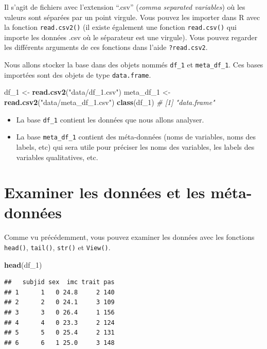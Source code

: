 \documentclass[
]{book}
\newenvironment{Shaded}{\begin{snugshade}}{\end{snugshade}}
\newcommand{\CommentTok}[1]{\textcolor[rgb]{0.56,0.35,0.01}{\textit{#1}}}
\newcommand{\FunctionTok}[1]{\textcolor[rgb]{0.13,0.29,0.53}{\textbf{#1}}}
\newcommand{\NormalTok}[1]{#1}
\newcommand{\OtherTok}[1]{\textcolor[rgb]{0.56,0.35,0.01}{#1}}
\newcommand{\StringTok}[1]{\textcolor[rgb]{0.31,0.60,0.02}{#1}}
\providecommand{\tightlist}{%
  \setlength{\itemsep}{0pt}\setlength{\parskip}{0pt}}
\begin{document}
Il s'agit de fichiers avec l'extension ``.csv'' (\emph{comma separated variables}) où les valeurs sont séparées par un point virgule. Vous pouvez les importer dans R avec la fonction \texttt{read.csv2()} (il existe également une fonction \texttt{read.csv()} qui importe les données .csv où le séparateur est une virgule). Vous pouvez regarder les différents arguments de ces fonctions dans l'aide \texttt{?read.csv2}.

Nous allons stocker la base dans des objets nommés \texttt{df\_1} et \texttt{meta\_df\_1}. Ces bases importées sont des objets de type \texttt{data.frame}.

\begin{Shaded}
\begin{Highlighting}[]
\NormalTok{df\_1 }\OtherTok{\textless{}{-}} \FunctionTok{read.csv2}\NormalTok{(}\StringTok{"data/df\_1.csv"}\NormalTok{)}
\NormalTok{meta\_df\_1 }\OtherTok{\textless{}{-}} \FunctionTok{read.csv2}\NormalTok{(}\StringTok{"data/meta\_df\_1.csv"}\NormalTok{)}
\FunctionTok{class}\NormalTok{(df\_1)  }\CommentTok{\# [1] "data.frame"}
\end{Highlighting}
\end{Shaded}

\begin{itemize}
\tightlist
\item
  La base \texttt{df\_1} contient les données que nous allons analyser.
\item
  La base \texttt{meta\_df\_1} contient des méta-données (noms de variables, noms des labels, etc) qui sera utile pour préciser les noms des variables, les labels des variables qualitatives, etc.
\end{itemize}

\section{Examiner les données et les méta-données}\label{examiner-les-donnuxe9es-et-les-muxe9ta-donnuxe9es}

Comme vu précédemment, vous pouvez examiner les données avec les fonctions \texttt{head()}, \texttt{tail()}, \texttt{str()} et \texttt{View()}.

\begin{Shaded}
\begin{Highlighting}[]
\FunctionTok{head}\NormalTok{(df\_1)}
\end{Highlighting}
\end{Shaded}

\begin{verbatim}
##   subjid sex  imc trait pas
## 1      1   0 24.8     2 140
## 2      2   0 24.1     3 109
## 3      3   0 26.4     1 156
## 4      4   0 23.3     2 124
## 5      5   0 25.4     2 131
## 6      6   1 25.0     3 148
\end{verbatim}
\end{document}
